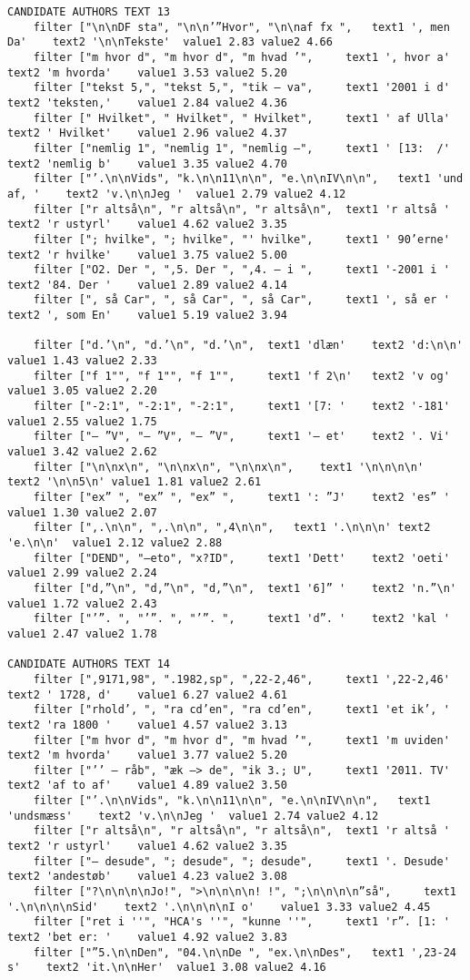 {\begin{verbatim}
CANDIDATE AUTHORS TEXT 13
	filter ["\n\nDF sta", "\n\n’”Hvor", "\n\naf fx ", 	text1 ', men Da'	text2 '\n\nTekste'	value1 2.83	value2 4.66
	filter ["m hvor d", "m hvor d", "m hvad ’", 	text1 ', hvor a'	text2 'm hvorda'	value1 3.53	value2 5.20
	filter ["tekst 5,", "tekst 5,", "tik – va", 	text1 '2001 i d'	text2 'teksten,'	value1 2.84	value2 4.36
	filter [" Hvilket", " Hvilket", " Hvilket", 	text1 ' af Ulla'	text2 ' Hvilket'	value1 2.96	value2 4.37
	filter ["nemlig 1", "nemlig 1", "nemlig –", 	text1 ' [13:  /'	text2 'nemlig b'	value1 3.35	value2 4.70
	filter ["’.\n\nVids", "k.\n\n11\n\n", "e.\n\nIV\n\n", 	text1 'und af, '	text2 'v.\n\nJeg '	value1 2.79	value2 4.12
	filter ["r altså\n", "r altså\n", "r altså\n", 	text1 'r altså '	text2 'r ustyrl'	value1 4.62	value2 3.35
	filter ["; hvilke", "; hvilke", "' hvilke", 	text1 ' 90’erne'	text2 'r hvilke'	value1 3.75	value2 5.00
	filter ["O2. Der ", ",5. Der ", ",4. – i ", 	text1 '-2001 i '	text2 '84. Der '	value1 2.89	value2 4.14
	filter [", så Car", ", så Car", ", så Car", 	text1 ', så er '	text2 ', som En'	value1 5.19	value2 3.94

	filter ["d.’\n", "d.’\n", "d.’\n", 	text1 'dlæn'	text2 'd:\n\n'	value1 1.43	value2 2.33
	filter ["f 1"", "f 1"", "f 1"", 	text1 'f 2\n'	text2 'v og'	value1 3.05	value2 2.20
	filter ["-2:1", "-2:1", "-2:1", 	text1 '[7: '	text2 '-181'	value1 2.55	value2 1.75
	filter ["– ”V", "– ”V", "– ”V", 	text1 '– et'	text2 '. Vi'	value1 3.42	value2 2.62
	filter ["\n\nx\n", "\n\nx\n", "\n\nx\n", 	text1 '\n\n\n\n'	text2 '\n\n5\n'	value1 1.81	value2 2.61
	filter ["ex” ", "ex” ", "ex” ", 	text1 ': ”J'	text2 'es” '	value1 1.30	value2 2.07
	filter [",.\n\n", ",.\n\n", ",4\n\n", 	text1 '.\n\n\n'	text2 'e.\n\n'	value1 2.12	value2 2.88
	filter ["DEND", "–eto", "x?ID", 	text1 'Dett'	text2 'oeti'	value1 2.99	value2 2.24
	filter ["d,”\n", "d,”\n", "d,”\n", 	text1 '6]” '	text2 'n.”\n'	value1 1.72	value2 2.43
	filter ["’”. ", "’”. ", "’”. ", 	text1 'd”. '	text2 'kal '	value1 2.47	value2 1.78

CANDIDATE AUTHORS TEXT 14
	filter [",9171,98", ".1982,sp", ",22-2,46", 	text1 ',22-2,46'	text2 ' 1728, d'	value1 6.27	value2 4.61
	filter ["rhold’, ", "ra cd’en", "ra cd’en", 	text1 'et ik’, '	text2 'ra 1800 '	value1 4.57	value2 3.13
	filter ["m hvor d", "m hvor d", "m hvad ’", 	text1 'm uviden'	text2 'm hvorda'	value1 3.77	value2 5.20
	filter ["’’ – råb", "æk –> de", "ik 3.; U", 	text1 '2011. TV'	text2 'af to af'	value1 4.89	value2 3.50
	filter ["’.\n\nVids", "k.\n\n11\n\n", "e.\n\nIV\n\n", 	text1 'undsmæss'	text2 'v.\n\nJeg '	value1 2.74	value2 4.12
	filter ["r altså\n", "r altså\n", "r altså\n", 	text1 'r altså '	text2 'r ustyrl'	value1 4.62	value2 3.35
	filter ["– desude", "; desude", "; desude", 	text1 '. Desude'	text2 'andestøb'	value1 4.23	value2 3.08
	filter ["?\n\n\n\nJo!", ">\n\n\n\n! !", ";\n\n\n\n”så", 	text1 '.\n\n\n\nSid'	text2 '.\n\n\n\nI o'	value1 3.33	value2 4.45
	filter ["ret i ''", "HCA's ''", "kunne ''", 	text1 'r”. [1: '	text2 'bet er: '	value1 4.92	value2 3.83
	filter ["”5.\n\nDen", "04.\n\nDe ", "ex.\n\nDes", 	text1 ',23-24 s'	text2 'it.\n\nHer'	value1 3.08	value2 4.16


\end{verbatim}}
